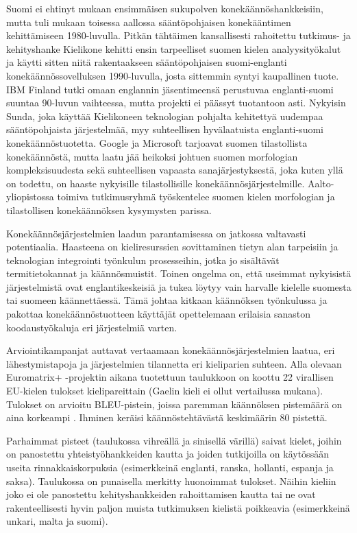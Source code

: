 \documentclass[]{../../metanetpaper}
\begin{document}
\begin{Parallel}[c]{77mm}{77mm}
{Suomi ei ehtinyt mukaan ensimmäisen sukupolven konekäännöshankkeisiin,
mutta tuli mukaan toisessa aallossa sääntöpohjaisen konekääntimen
kehittämiseen 1980-luvulla. Pitkän tähtäimen kansallisesti rahoitettu
tutkimus- ja kehityshanke Kielikone kehitti ensin tarpeelliset suomen
kielen analyysityökalut ja käytti sitten niitä rakentaakseen
sääntöpohjaisen suomi-englanti konekäännössovelluksen 1990-luvulla,
josta sittemmin syntyi kaupallinen tuote. IBM Finland tutki omaan
englannin jäsentimeensä perustuvaa englanti-suomi suuntaa 90-luvun
vaihteessa, mutta projekti ei päässyt tuotantoon asti. Nykyisin Sunda,
joka käyttää Kielikoneen teknologian pohjalta kehitettyä uudempaa
sääntöpohjaista järjestelmää, myy suhteellisen hyvälaatuista
englanti-suomi konekäännöstuotetta. Google ja Microsoft tarjoavat
suomen tilastollista konekäännöstä, mutta laatu jää heikoksi johtuen
suomen morfologian kompleksisuudesta sekä suhteellisen vapaasta
sanajärjestyksestä, joka kuten yllä on todettu, on haaste nykyisille
tilastollisille konekäännösjärjestelmille. Aalto-yliopistossa toimiva
tutkimusryhmä työskentelee suomen kielen morfologian ja tilastollisen
konekäännöksen kysymysten parissa.

Konekäännösjärjestelmien laadun parantamisessa on jatkossa valtavasti
potentiaalia. Haasteena on kieliresurssien sovittaminen tietyn alan
tarpeisiin ja teknologian integrointi työnkulun prosesseihin, jotka jo
sisältävät termitietokannat ja käännösmuistit. Toinen ongelma on, että
useimmat nykyisistä järjestelmistä ovat englantikeskeisiä ja tukea
löytyy vain harvalle kielelle suomesta tai suomeen käännettäessä. Tämä
johtaa kitkaan käännöksen työnkulussa ja pakottaa konekäännöstuotteen
käyttäjät opettelemaan erilaisia sanaston koodaustyökaluja eri
järjestelmiä varten.

Arviointikampanjat auttavat vertaamaan konekäännösjärjestelmien
laatua, eri lähestymistapoja ja järjestelmien tilannetta eri
kieliparien suhteen. Alla olevaan Euromatrix+ -projektin aikana
tuotettuun taulukkoon on koottu 22 virallisen EU-kielen tulokset
kielipareittain (Gaelin kieli ei ollut vertailussa mukana). Tulokset
on arvioitu BLEU-pistein, joissa paremman käännöksen pistemäärä on
aina korkeampi \cite{BLEU}. Ihminen keräisi käännöstehtävästä
keskimäärin 80 pistettä.

Parhaimmat pisteet (taulukossa vihreällä ja sinisellä värillä) saivat
kielet, joihin on panostettu yhteistyöhankkeiden kautta ja joiden
tutkijoilla on käytössään useita rinnakkaiskorpuksia (esimerkkeinä
englanti, ranska, hollanti, espanja ja saksa). Taulukossa on
punaisella merkitty huonoimmat tulokset.  Näihin kieliin joko ei ole
panostettu kehityshankkeiden rahoittamisen kautta tai ne ovat
rakenteellisesti hyvin paljon muista tutkimuksen kielistä poikkeavia
(esimerkkeinä unkari, malta ja suomi).


}
\end{Parallel}
\end{document}
